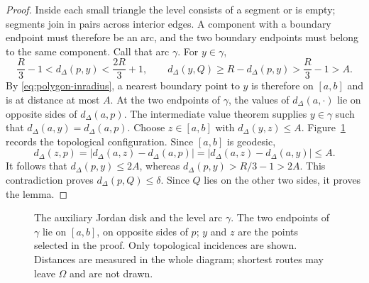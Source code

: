 \begin{proof}
Inside each small triangle the level consists of a segment or is empty;
segments join in pairs across interior edges. A component with a boundary
endpoint must therefore be an arc, and the two boundary endpoints must
belong to the same component. Call that arc $\gamma$. For $y\in\gamma$,
\[
 \frac R3-1<d_\Delta(p,y)<\frac{2R}3+1,
 \qquad
 d_\Delta(y,Q)\ge R-d_\Delta(p,y)>\frac R3-1>A.
\]
By \eqref{eq:polygon-inradius}, a nearest boundary point to $y$ is
therefore on $[a,b]$ and is at distance at most $A$.
At the two endpoints of $\gamma$, the values of
$d_\Delta(a,\cdot)$ lie on opposite sides of $d_\Delta(a,p)$.
The intermediate value theorem supplies $y\in\gamma$ such that
$d_\Delta(a,y)=d_\Delta(a,p)$. Choose $z\in[a,b]$ with
$d_\Delta(y,z)\le A$. Figure~\ref{fig:level-arc} records the
topological configuration. Since $[a,b]$ is geodesic,
\[
 d_\Delta(z,p)
 =\bigl|d_\Delta(a,z)-d_\Delta(a,p)\bigr|
 =\bigl|d_\Delta(a,z)-d_\Delta(a,y)\bigr|\le A.
\]
It follows that $d_\Delta(p,y)\le2A$, whereas
$d_\Delta(p,y)>R/3-1>2A$. This contradiction proves
$d_\Delta(p,Q)\le\delta$. Since $Q$ lies on the other two sides, it
proves the lemma.
\end{proof}

\begin{figure}[htbp]
\centering
{}
\caption{The auxiliary Jordan disk and the level arc $\gamma$. The two
endpoints of $\gamma$ lie on $[a,b]$, on opposite sides of $p$;
$y$ and $z$ are the points selected in the proof. Only topological
incidences are shown. Distances are measured in the whole diagram;
shortest routes may leave $\Omega$ and are not drawn.}
\label{fig:level-arc}
\end{figure}

